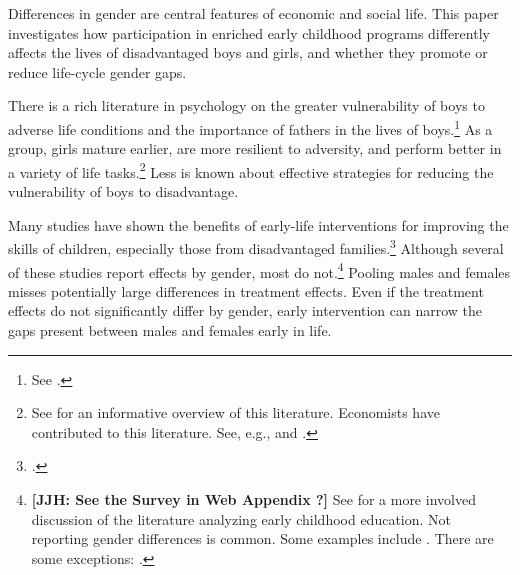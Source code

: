 Differences in gender are central features of economic and social life. This paper investigates how participation in enriched early childhood programs differently affects the lives of disadvantaged boys and girls, and whether they promote or reduce life-cycle gender gaps.

There is a rich literature in psychology on the greater vulnerability of boys to adverse life conditions and the importance of fathers in the lives of boys.\footnote{See \citet{golding2016psychology}.} As a group, girls mature earlier, are more resilient to adversity, and perform better in a variety of life tasks.\footnote{See \cite{Schore_2017_IMHJ} for an informative overview of this literature. Economists have contributed to this literature. See, e.g., \cite{Bertrand_Pan_2013_AEJAE,Autor-etal_2015_Family-Disadvantage} and \cite{Kottelenberg-Lehrer_2014_Gender-Effects}.} Less is known about effective strategies for reducing the vulnerability of boys to disadvantage.

Many studies have shown the benefits of early-life interventions for improving the skills of children, especially those from disadvantaged families.\footnote{\citet{Currie_2011_AER,Elango_Hojman_etal_2016_Early-Edu}.} Although several of these studies report effects by gender, most do not.\footnote{\textbf{[JJH: See the Survey in Web Appendix ?]} See \citet{Elango_Hojman_etal_2016_Early-Edu} for a more involved discussion of the literature analyzing early childhood education. Not reporting gender differences is common. Some examples include \citet{Bernal_Keane_2011_JoLE,Cascio_Schanzenbach_2013_ImpactsExpandingAccess,Bitler_et_al_2014_Head_Start_Unpublished,Kline_Walters_2016_QJE}. There are some exceptions: \citet{Heckman_Moon_etal_2010_QE,Campbell_Conti_etal_2014_EarlyChildhoodInvestments,Garcia_Heckman_Leaf_etal_2017_Comp_CBA_Unpublished}.} Pooling males and females misses potentially large differences in treatment effects. Even if the treatment effects do not significantly differ by gender, early intervention can narrow the gaps present between males and females early in life.

